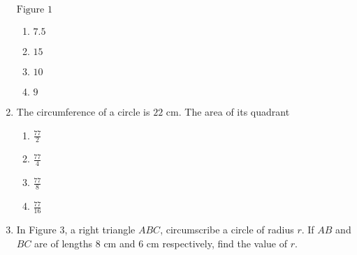 \begin{enumerate}
\begin{figure} [h]
\end{figure}
\begin{center}
$\text{Figure } 1$
\end{center}
\begin{enumerate}
\item $7.5$\\
\item $15$\\
\item $10$\\
\item $9$\\
\end{enumerate}
\item The circumference of a circle is $22 \text{ cm}$. The area of its quadrant \\
\begin{enumerate}
\item $\frac{77}{2}$\\
\item $\frac{77}{4}$\\
\item $\frac{77}{8}$\\
\item $\frac{77}{16}$\\
\end{enumerate}
\item In Figure $3$, a right triangle $ABC$, circumscribe a circle of radius $r$. If $AB$ and $BC$ are of lengths $8 \text{ cm}$ and $6 \text{ cm}$ respectively, find the value of $r$.\\
\begin{figure}[ht]
\centering
{}
\end{figure}
\end{enumerate}

